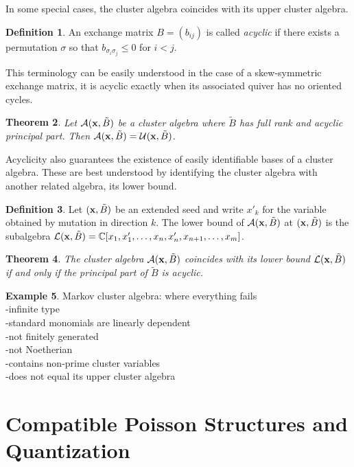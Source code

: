 \documentclass{amsart}
\newtheorem{theorem}{Theorem}[section]
\theoremstyle{definition}
\newtheorem{definition}[theorem]{Definition}
\newtheorem{example}[theorem]{Example}
\theoremstyle{remark}
\numberwithin{equation}{section}
\newcommand{\cA}{{\mathcal{A}}}
\newcommand{\cL}{{\mathcal{L}}}
\newcommand{\cU}{{\mathcal{U}}}
\newcommand{\x}{{\bf x}}
\newcommand{\CC}{{\mathbb{C}}}
\begin{document}
  In some special cases, the cluster algebra coincides with its upper cluster algebra.
  \begin{definition}
    An exchange matrix $B=(b_{ij})$ is called \emph{acyclic} if there exists a permutation $\sigma$ so that $b_{\sigma_i\sigma_j}\le 0$ for $i<j$.
  \end{definition}
  This terminology can be easily understood in the case of a skew-symmetric exchange matrix, it is acyclic exactly when its associated quiver has no oriented cycles.

  \begin{theorem}
    Let $\cA(\x,\tilde B)$ be a cluster algebra where $\tilde B$ has full rank and acyclic principal part.  Then $\cA(\x,\tilde B)=\cU(\x,\tilde B)$.
  \end{theorem}

  Acyclicity also guarantees the existence of easily identifiable bases of a cluster algebra.  These are best understood by identifying the cluster algebra with another related algebra, its lower bound.
  \begin{definition}
    Let $(\x,\tilde B)$ be an extended seed and write $x'_k$ for the variable obtained by mutation in direction $k$.  The lower bound of $\cA(\x,\tilde B)$ at $(\x,\tilde B)$ is the subalgebra $\cL(\x,\tilde B)=\CC[x_1,x'_1,\ldots,x_n,x'_n,x_{n+1},\ldots,x_m]$.
  \end{definition}

  \begin{theorem}
    The cluster algebra $\cA(\x,\tilde B)$ coincides with its lower bound $\cL(\x,\tilde B)$ if and only if the principal part of $\tilde B$ is acyclic.
  \end{theorem}

  \begin{example}
    Markov cluster algebra: where everything fails\\
    -infinite type\\
    -standard monomials are linearly dependent\\
    -not finitely generated\\
    -not Noetherian\\
    -contains non-prime cluster variables\\
    -does not equal its upper cluster algebra
  \end{example}

\section{Compatible Poisson Structures and Quantization}\label{sec:poisson_and_quantum}
\end{document}

